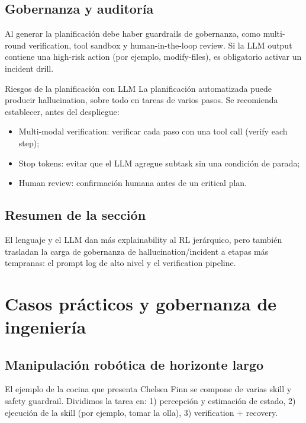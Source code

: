 \documentclass[a4paper]{article}
\begin{document}
\subsection{Gobernanza y auditoría}

Al generar la planificación debe haber guardrails de gobernanza, como multi-round verification, tool sandbox y human-in-the-loop review. Si la LLM output contiene una high-risk action (por ejemplo, modify-files), es obligatorio activar un incident drill.

\begin{warningbox}{Riesgos de la planificación con LLM}
La planificación automatizada puede producir hallucination, sobre todo en tareas de varios pasos. Se recomienda establecer, antes del despliegue:
\begin{itemize}
    \item Multi-modal verification: verificar cada paso con una tool call (verify each step);
    \item Stop tokens: evitar que el LLM agregue subtask sin una condición de parada;
    \item Human review: confirmación humana antes de un critical plan.
\end{itemize}
\end{warningbox}

\subsection{Resumen de la sección}

El lenguaje y el LLM dan más explainability al RL jerárquico, pero también trasladan la carga de gobernanza de hallucination/incident a etapas más tempranas: el prompt log de alto nivel y el verification pipeline.
\section{Casos prácticos y gobernanza de ingeniería}

\subsection{Manipulación robótica de horizonte largo}

El ejemplo de la cocina que presenta Chelsea Finn se compone de varias skill y safety guardrail. Dividimos la tarea en: 1) percepción y estimación de estado, 2) ejecución de la skill (por ejemplo, tomar la olla), 3) verification + recovery.
\end{document}
